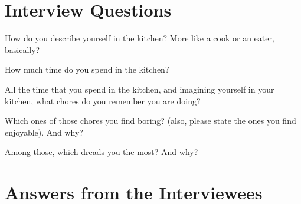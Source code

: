 \documentclass[a4paper,11pt,oneside]{scrreprt}
\begin{document}
		\section{Interview Questions}
			
			\begin{compactitem}
				\item How do you describe yourself in the kitchen? More like a cook or an eater, basically?
				\item How much time do you spend in the kitchen?
				\item All the time that you spend in the kitchen, and imagining yourself in your kitchen, what chores do you remember you are doing?
				\item Which ones of those chores you find boring? (also, please state the ones you find enjoyable). And why?
				\item Among those, which dreads you the most? And why?
			\end{compactitem}
	
	\section{Answers from the Interviewees}
	
\end{document}
